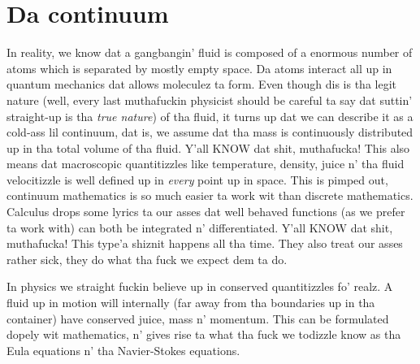 \section{Da continuum}
\label{sec:continuum}
In reality, we know dat a gangbangin' fluid is composed of a enormous number of atoms which is separated by mostly empty space. Da atoms interact all up in quantum mechanics dat allows moleculez ta form. Even though dis is tha legit nature (well, every last muthafuckin physicist should be careful ta say dat suttin' straight-up is tha \textit{true nature}) of tha fluid, it turns up dat we can describe it as a cold-ass lil continuum, dat is, we assume dat tha mass is continuously distributed up in tha total volume of tha fluid. Y'all KNOW dat shit, muthafucka! This also means dat macroscopic quantitizzles like temperature, density, juice n' tha fluid velocitizzle is well defined up in \textit{every} point up in space. This is pimped out, continuum mathematics is so much easier ta work wit than discrete mathematics. Calculus  drops some lyrics ta our asses dat well behaved functions (as we prefer ta work with) can both be integrated n' differentiated. Y'all KNOW dat shit, muthafucka! This type'a shiznit happens all tha time. They also treat our asses rather sick, they do what tha fuck we expect dem ta do.

In physics we straight fuckin believe up in conserved quantitizzles fo' realz. A fluid up in motion will internally (far away from tha boundaries up in tha container) have conserved juice, mass n' momentum. This can be formulated dopely wit mathematics, n' gives rise ta what tha fuck we todizzle know as tha Eula equations n' tha Navier-Stokes equations.
